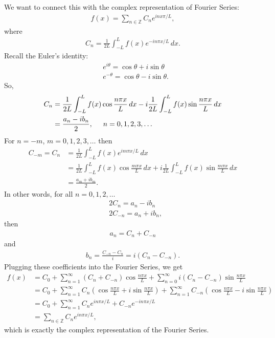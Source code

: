 \documentclass{book}
\theoremstyle{definition}
\begin{document}
We want to connect this with the complex representation of Fourier Series:
\begin{align*}
f(x) = \sum_{n\in \mathbb{Z}} C_n e^{inx\pi/L},
\end{align*}
where 
\begin{align*}
C_n = \frac{1}{2L}\int^L_{-L}f(x)e^{-in\pi x/L}\,dx.
\end{align*}
Recall the Euler's identity:
\begin{align*}
&e^{i\theta} = \cos\theta + i\sin\theta\\
&e^{-\theta} = \cos\theta - i\sin\theta.
\end{align*}
So,
\begin{align*}
C_n &= \frac{1}{2L}\int^L_{-L}f(x)\cos\frac{n\pi x}{L}\,dx - i\frac{1}{2L}\int^L_{-L}f(x)\sin\frac{n\pi x}{L}\,dx\\
&= \frac{a_n - ib_n}{2},\hspace{0.5cm}n=0,1,2,3,\dots
\end{align*}
For $n=-m$, $m=0,1,2,3,\dots$ then
\begin{align*}
C_{-m} = C_n &= \frac{1}{2L}\int^L_{-L}f(x)e^{im\pi x/L}\,dx\\
&= \frac{1}{2L}\int^L_{-L}f(x)\cos\frac{m\pi x}{L}\,dx + i\frac{1}{2L}\int^L_{-L}f(x)\sin\frac{m\pi x}{L}\,dx\\
&= \frac{a_m + ib_m}{2}.
\end{align*}
In other words, for all $n=0,1,2,\dots$
\begin{align*}
&2C_n = a_n - ib_n\\
&2C_{-n} = a_n + ib_n,
\end{align*}
then
\begin{align*}
a_n = C_n + C_{-n}
\end{align*}
and
\begin{align*}
b_n = \frac{C_{-n} - C_n}{i} = i(C_n - C_{-n}).
\end{align*}
Plugging these coefficients into the Fourier Series, we get
\begin{align*}
f(x) &= C_0 + \sum^\infty_{n=1}(C_n + C_{-n})\cos\frac{n\pi x}{L} + \sum^\infty_{n=0}i(C_n - C_{-n})\sin\frac{n\pi x}{L}\\
&= C_0 + \sum^\infty_{n=1}C_n\left(\cos\frac{n\pi x}{L} + i\sin\frac{n\pi x}{L}\right) + \sum^\infty_{n=1}C_{-n}\left(\cos\frac{n\pi x}{L} - i\sin\frac{n\pi x}{L}\right)\\
&= C_0 + \sum^\infty_{n=1}C_ne^{in\pi x/L} + C_{-n}e^{-in\pi x/L}\\
&= \sum_{n\in \mathbb{Z}}C_ne^{in\pi x/L},
\end{align*}
which is exactly the complex representation of the Fourier Series. \\
\end{document}
